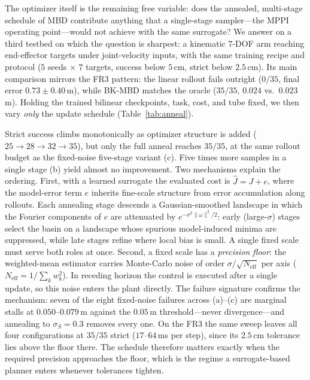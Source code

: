 \documentclass[lettersize,journal]{IEEEtran}
\theoremstyle{remark}
\newcommand{\bkmbd}{\textsc{BK-MBD}}
\begin{document}
The optimizer itself is the remaining free variable: does the annealed,
multi-stage schedule of MBD contribute anything that a single-stage
sampler---the MPPI operating point---would not achieve with the same
surrogate?
We answer on a third testbed on which the question is sharpest: a
kinematic $7$-DOF arm reaching end-effector targets under
joint-velocity inputs, with the same training recipe and protocol
($5$ seeds $\times$ $7$ targets, success below $5$\,cm, strict below
$2.5$\,cm). Its main comparison mirrors the FR3 pattern: the linear
rollout fails outright ($0/35$, final error $0.73 \pm 0.40$\,m), while
\bkmbd{} matches the oracle ($35/35$, $0.024$ vs.\ $0.023$\,m).
Holding the trained bilinear checkpoints, task, cost, and tube fixed, we
then vary \emph{only} the update schedule (Table~\ref{tab:anneal}).

Strict success climbs monotonically as optimizer structure is added
($25 \to 28 \to 32 \to 35$), but only the full anneal reaches $35/35$,
at the same rollout budget as the fixed-noise five-stage variant (c).
Five times more samples in a single stage (b) yield almost no
improvement.
Two mechanisms explain the ordering.
First, with a learned surrogate the evaluated cost is
$\hat J = J + e$, where the model-error term $e$ inherits fine-scale
structure from error accumulation along rollouts. Each annealing stage
descends a Gaussian-smoothed landscape in which the Fourier components
of $e$ are attenuated by $e^{-\sigma^{2}\|\omega\|^{2}/2}$: early
(large-$\sigma$) stages select the basin on a landscape whose spurious
model-induced minima are suppressed, while late stages refine where
local bias is small. A single fixed scale must serve both roles at
once.
Second, a fixed scale has a \emph{precision floor}: the weighted-mean
estimator carries Monte-Carlo noise of order
$\sigma/\sqrt{N_{\mathrm{eff}}}$ per axis
($N_{\mathrm{eff}} = 1/\sum_k w_k^{2}$). In receding horizon the
control is executed after a single update, so this noise enters the
plant directly.
The failure signature confirms the mechanism: seven of the eight
fixed-noise failures across (a)--(c) are marginal stalls at
$0.050$--$0.079$\,m against the $0.05$\,m threshold---never
divergence---and annealing to $\sigma_S = 0.3$ removes every one.
On the FR3 the same sweep leaves all four configurations at $35/35$
strict ($17$--$64$\,ms per step), since its $2.5$\,cm tolerance lies
above the floor there. The schedule therefore matters exactly when the
required precision approaches the floor, which is the regime a
surrogate-based planner enters whenever tolerances tighten.
\end{document}
